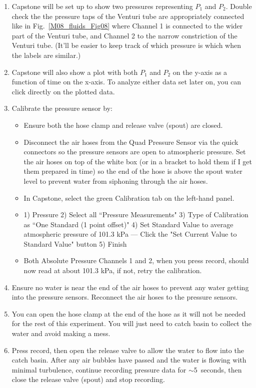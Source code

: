 \begin{enumerate}
\item Capstone will be set up to show two pressures representing $P_1$ and $P_2$. Double check the the pressure taps of the Venturi tube are appropriately connected like in Fig.~\ref{M08_fluids_Fig08} where Channel 1 is connected to the wider part of the Venturi tube, and Channel 2 to the narrow constriction of the Venturi tube. (It'll be easier to keep track of which pressure is which when the labels are similar.) 
\item Capstone will also show a plot with both $P_1$ and $P_2$ on the y-axis as a function of time on the x-axis. To analyze either data set later on, you can click directly on the plotted data.
\item Calibrate the pressure sensor by:
\begin{itemize}
    \item Ensure both the hose clamp and release valve (spout) are closed.
    \item Disconnect the air hoses from the Quad Pressure Sensor via the quick connectors so the pressure sensors are open to atmospheric pressure. Set the air hoses on top of the white box (or in a bracket to hold them if I get them prepared in time) so the end of the hose is above the spout water level to prevent water from siphoning through the air hoses.
    \item In Capstone, select the green Calibration tab on the left-hand panel.
    \item 1) Pressure 2) Select all ``Pressure Measurements" 3) Type of Calibration as ``One Standard (1 point offset)" 4) Set Standard Value to average atmospheric pressure of 101.3 kPa --- Click the "Set Current Value to Standard Value" button 5) Finish
    \item Both Absolute Pressure Channels 1 and 2, when you press record, should now read at about 101.3 kPa, if not, retry the calibration.
\end{itemize}
\item Ensure no water is near the end of the air hoses to prevent any water getting into the pressure sensors. Reconnect the air hoses to the pressure sensors.
\item You can open the hose clamp at the end of the hose as it will not be needed for the rest of this experiment. You will just need to catch basin to collect the water and avoid making a mess.
\item Press record, then open the release valve to allow the water to flow into the catch basin. After any air bubbles have passed and the water is flowing with minimal turbulence, continue recording pressure data for $\sim$5~seconds, then close the release valve (spout) and stop recording.

\end{enumerate}
